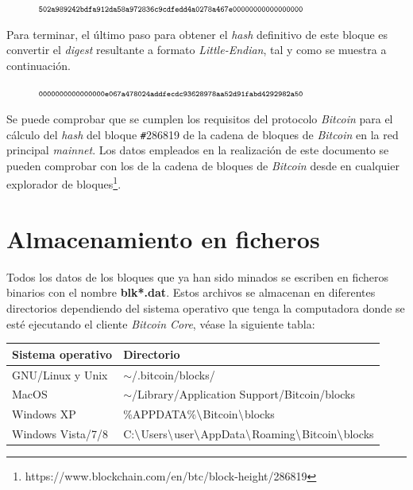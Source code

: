 \documentclass{article}
\begin{document}
        \begin{figure}[H]
        \centering
            $\scriptsize{\texttt{502a989242bdfa912da58a972836c9cdfedd4a0278a467e00000000000000000}}$
        \end{figure}
        Para terminar, el último paso para obtener el \textit{hash} definitivo de este bloque es convertir el \textit{digest} resultante a formato \textit{Little-Endian}, tal y como se muestra a continuación.
        \begin{figure}[H]
        \centering
            $\scriptsize{\texttt{0000000000000000e067a478024addfecdc93628978aa52d91fabd4292982a50}}$
        \end{figure}
        Se puede comprobar que se cumplen los requisitos del protocolo \textit{Bitcoin} para el cálculo del \textit{hash} del bloque \texttt{\#}286819 de la cadena de bloques de \textit{Bitcoin} en la red principal \textit{mainnet}. Los datos empleados en la realización de este documento se pueden comprobar con los de la cadena de bloques de \textit{Bitcoin} desde en cualquier explorador de bloques\footnote{https://www.blockchain.com/en/btc/block-height/286819}.

\section{Almacenamiento en ficheros}
    Todos los datos de los bloques que ya han sido minados se escriben en ficheros binarios con el nombre \textbf{blk*.dat}. Estos archivos se almacenan en diferentes directorios dependiendo del sistema operativo que tenga la computadora donde se esté ejecutando el cliente \textit{Bitcoin Core}, véase la siguiente tabla:
    
    \begin{table}[H]
    \centering
    \begin{tabular}{| l | l |} 
        \hline
        Sistema operativo & Directorio \\
        \hline
        GNU/Linux y Unix & $\sim$/.bitcoin/blocks/ \\
        \hline
        MacOS & $\sim$/Library/Application Support/Bitcoin/blocks \\
        \hline
        Windows XP & \%APPDATA\%$\char`\\$Bitcoin$\char`\\$blocks \\
        \hline
        Windows Vista/7/8 & C:$\char`\\$Users$\char`\\$user$\char`\\$AppData$\char`\\$Roaming$\char`\\$Bitcoin$\char`\\$blocks \\
        \hline
    \end{tabular}
    \label{table:2}
    \end{table}
    
\end{document}
